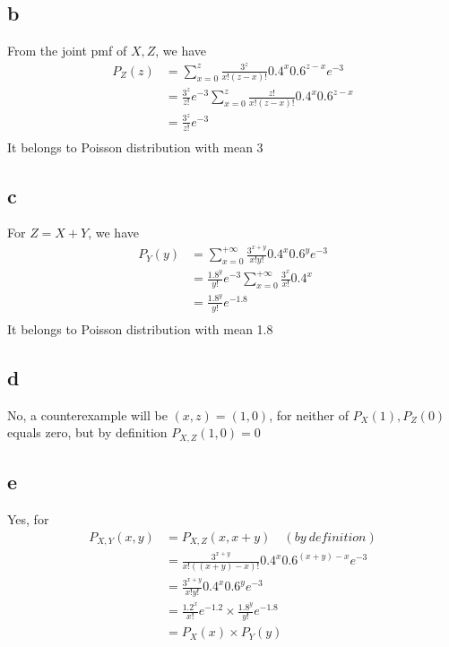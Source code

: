 \documentclass[12pt,letterpaper]{article}
\begin{document}
    \subsection*{b}
        From the joint pmf of $X, Z$, we have
        \begin{equation*}
            \begin{aligned}
                P_{Z}(z) &= \sum_{x = 0}^{z} \frac{3^{z}}{x!(z - x)!} 0.4^{x} 0.6^{z - x} e^{-3} \\
                &= \frac{3^{z}}{z!}e^{-3} \sum_{x = 0}^{z} \frac{z!}{x!(z - x)!} 0.4^{x} 0.6^{z - x} \\
                &= \frac{3^{z}}{z!}e^{-3} \\
            \end{aligned}
        \end{equation*}
        It belongs to Poisson distribution with mean 3
    \subsection*{c}
        For $Z = X + Y$, we have
        \begin{equation}
            \begin{aligned}
                P_{Y}(y) &= \sum_{x = 0}^{+\infty} \frac{3^{x + y}}{x!y!} 0.4^{x} 0.6^{y} e^{-3} \\
                &= \frac{1.8^{y}}{y!} e^{-3} \sum_{x = 0}^{+\infty} \frac{3^{x}}{x!} 0.4^{x} \\
                &= \frac{1.8^{y}}{y!} e^{-1.8} \\
            \end{aligned}
        \end{equation}
        It belongs to Poisson distribution with mean 1.8
    \subsection*{d}
        No, a counterexample will be $(x, z) = (1, 0)$, for neither of $P_{X}(1), P_{Z}(0)$ equals zero, but by definition $P_{X, Z}(1, 0) = 0$
    \subsection*{e}
        Yes, for
        \begin{equation*}
            \begin{aligned}
                P_{X, Y}(x, y) &= P_{X, Z}(x, x + y)\quad (by\ definition) \\
                &= \frac{3^{x + y}}{x!((x + y) - x)!} 0.4^{x} 0.6^{(x + y) - x} e^{-3} \\
                &= \frac{3^{x + y}}{x!y!} 0.4^{x} 0.6^{y} e^{-3} \\
                &= \frac{1.2^{x}}{x!}e^{-1.2} \times \frac{1.8^{y}}{y!} e^{-1.8} \\
                &= P_{X}(x) \times P_{Y}(y) \\
            \end{aligned}
        \end{equation*}
\end{document}
